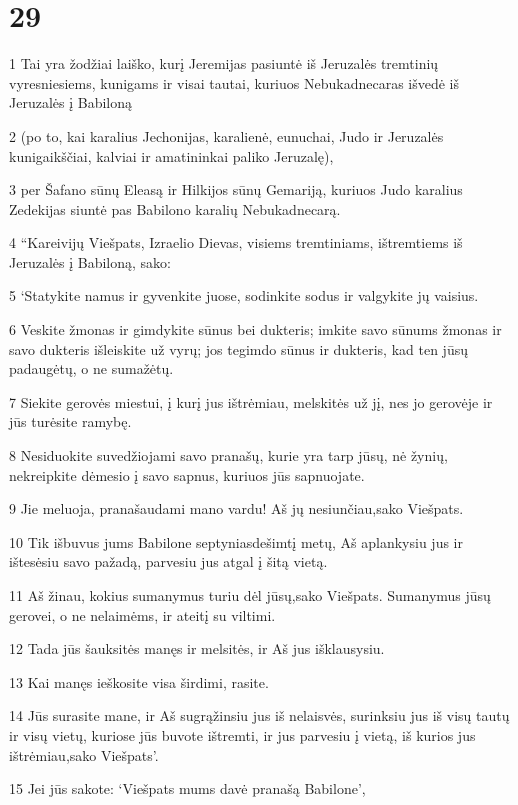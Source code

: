 \chapter{29}


\par 1 Tai yra žodžiai laiško, kurį Jeremijas pasiuntė iš Jeruzalės tremtinių vyresniesiems, kunigams ir visai tautai, kuriuos Nebukadnecaras išvedė iš Jeruzalės į Babiloną 
\par 2 (po to, kai karalius Jechonijas, karalienė, eunuchai, Judo ir Jeruzalės kunigaikščiai, kalviai ir amatininkai paliko Jeruzalę), 
\par 3 per Šafano sūnų Eleasą ir Hilkijos sūnų Gemariją, kuriuos Judo karalius Zedekijas siuntė pas Babilono karalių Nebukadnecarą. 
\par 4 “Kareivijų Viešpats, Izraelio Dievas, visiems tremtiniams, ištremtiems iš Jeruzalės į Babiloną, sako: 
\par 5 ‘Statykite namus ir gyvenkite juose, sodinkite sodus ir valgykite jų vaisius. 
\par 6 Veskite žmonas ir gimdykite sūnus bei dukteris; imkite savo sūnums žmonas ir savo dukteris išleiskite už vyrų; jos tegimdo sūnus ir dukteris, kad ten jūsų padaugėtų, o ne sumažėtų. 
\par 7 Siekite gerovės miestui, į kurį jus ištrėmiau, melskitės už jį, nes jo gerovėje ir jūs turėsite ramybę. 
\par 8 Nesiduokite suvedžiojami savo pranašų, kurie yra tarp jūsų, nė žynių, nekreipkite dėmesio į savo sapnus, kuriuos jūs sapnuojate. 
\par 9 Jie meluoja, pranašaudami mano vardu! Aš jų nesiunčiau,­sako Viešpats.­ 
\par 10 Tik išbuvus jums Babilone septyniasdešimtį metų, Aš aplankysiu jus ir ištesėsiu savo pažadą, parvesiu jus atgal į šitą vietą. 
\par 11 Aš žinau, kokius sumanymus turiu dėl jūsų,­sako Viešpats.­ Sumanymus jūsų gerovei, o ne nelaimėms, ir ateitį su viltimi. 
\par 12 Tada jūs šauksitės manęs ir melsitės, ir Aš jus išklausysiu. 
\par 13 Kai manęs ieškosite visa širdimi, rasite. 
\par 14 Jūs surasite mane, ir Aš sugrąžinsiu jus iš nelaisvės, surinksiu jus iš visų tautų ir visų vietų, kuriose jūs buvote ištremti, ir jus parvesiu į vietą, iš kurios jus ištrėmiau,­sako Viešpats’. 
\par 15 Jei jūs sakote: ‘Viešpats mums davė pranašą Babilone’, 
